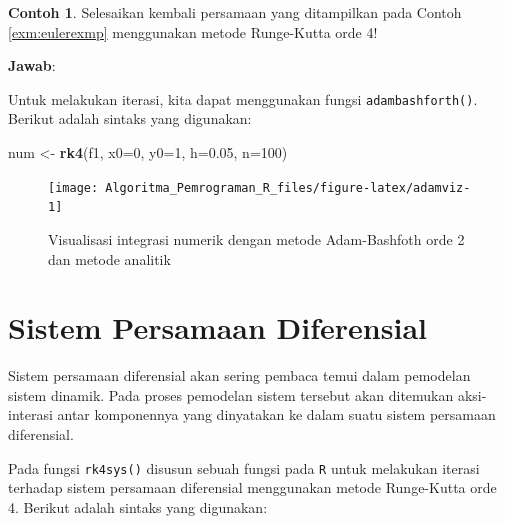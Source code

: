 \documentclass[
]{book}
\newenvironment{Shaded}{\begin{snugshade}}{\end{snugshade}}
\newcommand{\AttributeTok}[1]{\textcolor[rgb]{0.13,0.29,0.53}{#1}}
\newcommand{\DecValTok}[1]{\textcolor[rgb]{0.00,0.00,0.81}{#1}}
\newcommand{\FloatTok}[1]{\textcolor[rgb]{0.00,0.00,0.81}{#1}}
\newcommand{\FunctionTok}[1]{\textcolor[rgb]{0.13,0.29,0.53}{\textbf{#1}}}
\newcommand{\NormalTok}[1]{#1}
\newcommand{\OtherTok}[1]{\textcolor[rgb]{0.56,0.35,0.01}{#1}}
\theoremstyle{definition}
\theoremstyle{definition}
\newtheorem{example}{Contoh}[chapter]
\theoremstyle{definition}
\theoremstyle{definition}
\theoremstyle{remark}
\begin{document}
\begin{example}
\protect\hypertarget{exm:adamexmp}{}\label{exm:adamexmp}Selesaikan kembali persamaan yang ditampilkan pada Contoh \ref{exm:eulerexmp} menggunakan metode Runge-Kutta orde 4!
\end{example}

\textbf{Jawab}:

Untuk melakukan iterasi, kita dapat menggunakan fungsi \texttt{adambashforth()}. Berikut adalah sintaks yang digunakan:

\begin{Shaded}
\begin{Highlighting}[]
\NormalTok{num }\OtherTok{\textless{}{-}} \FunctionTok{rk4}\NormalTok{(f1, }\AttributeTok{x0=}\DecValTok{0}\NormalTok{, }\AttributeTok{y0=}\DecValTok{1}\NormalTok{, }\AttributeTok{h=}\FloatTok{0.05}\NormalTok{, }\AttributeTok{n=}\DecValTok{100}\NormalTok{)}
\end{Highlighting}
\end{Shaded}

\begin{figure}

{\centering \texttt{[image: Algoritma\_Pemrograman\_R\_files/figure-latex/adamviz-1]} 

}

\caption{Visualisasi integrasi numerik dengan metode Adam-Bashfoth orde 2 dan metode analitik}\label{fig:adamviz}
\end{figure}

\hypertarget{sysdiff}{%
\section{Sistem Persamaan Diferensial}\label{sysdiff}}

Sistem persamaan diferensial akan sering pembaca temui dalam pemodelan sistem dinamik. Pada proses pemodelan sistem tersebut akan ditemukan aksi-interasi antar komponennya yang dinyatakan ke dalam suatu sistem persamaan diferensial.

Pada fungsi \texttt{rk4sys()} disusun sebuah fungsi pada \texttt{R} untuk melakukan iterasi terhadap sistem persamaan diferensial menggunakan metode Runge-Kutta orde 4. Berikut adalah sintaks yang digunakan:
\end{document}
